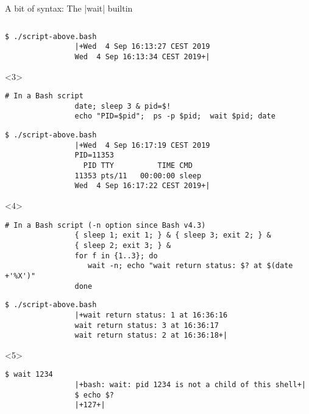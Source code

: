 \begin{frame}[fragile]{A bit of syntax: The \bash|wait| builtin}
\begin{overlayarea}{\textwidth}{0.7\textheight}
\begin{onlyenv}
\begin{lstlisting}[style=MyBash, numbers=none, aboveskip=3mm]
            \end{lstlisting}
            \begin{lstlisting}[style=MyBash, numbers=none, aboveskip=1mm]
                $ ./script-above.bash
                |+Wed  4 Sep 16:13:27 CEST 2019
                Wed  4 Sep 16:13:34 CEST 2019+|
            \end{lstlisting}
        \end{onlyenv}
        \begin{onlyenv}<3>
            \begin{lstlisting}[style=MyBash, numbers=none, aboveskip=3mm]
                # In a Bash script
                date; sleep 3 & pid=$!
                echo "PID=$pid";  ps -p $pid;  wait $pid; date
            \end{lstlisting}
            \begin{lstlisting}[style=MyBash, numbers=none, aboveskip=1mm]
                $ ./script-above.bash
                |+Wed  4 Sep 16:17:19 CEST 2019
                PID=11353
                  PID TTY          TIME CMD
                11353 pts/11   00:00:00 sleep
                Wed  4 Sep 16:17:22 CEST 2019+|
            \end{lstlisting}
        \end{onlyenv}
        \begin{onlyenv}<4>
            \begin{lstlisting}[style=MyBash, numbers=none, aboveskip=3mm]
                # In a Bash script (-n option since Bash v4.3)
                { sleep 1; exit 1; } & { sleep 3; exit 2; } &
                { sleep 2; exit 3; } &
                for f in {1..3}; do
                   wait -n; echo "wait return status: $? at $(date +'%X')"
                done
            \end{lstlisting}
            \begin{lstlisting}[style=MyBash, numbers=none, aboveskip=1mm]
                $ ./script-above.bash
                |+wait return status: 1 at 16:36:16
                wait return status: 3 at 16:36:17
                wait return status: 2 at 16:36:18+|
            \end{lstlisting}
        \end{onlyenv}
        \begin{onlyenv}<5>
            \begin{lstlisting}[style=MyBash, numbers=none, aboveskip=3mm]
                $ wait 1234
                |+bash: wait: pid 1234 is not a child of this shell+|
                $ echo $?
                |+127+|
            \end{lstlisting}
        \end{onlyenv}
    \end{overlayarea}
\end{frame}
